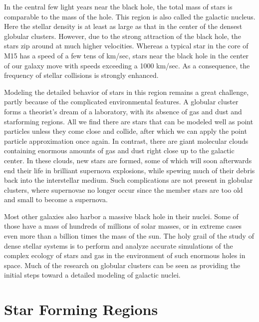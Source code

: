 In the central few light years near the black hole, the total mass of
stars is comparable to the mass of the hole.  This region is also
called the galactic nucleus.  Here the stellar density is at least as
large as that in the center of the densest globular clusters.  However,
due to the strong attraction of the black hole, the stars zip around at
much higher velocities.  Whereas a typical star in the core of M15 has
a speed of a few tens of km/sec, stars near the black hole in the
center of our galaxy move with speeds exceeding a 1000 km/sec.  As a
consequence, the frequency of stellar collisions is strongly enhanced.

Modeling the detailed behavior of stars in this region remains a great
challenge, partly because of the complicated environmental features.
A globular cluster forms a theorist's dream of a laboratory, with its
absence of gas and dust and starforming regions.  All we find there
are stars that can be modeled well as point particles unless they come
close and collide, after which we can apply the point particle
approximation once again.  In contrast, there are giant molecular
clouds containing enormous amounts of gas and dust right close up to
the galactic center.  In these clouds, new stars are formed, some of
which will soon afterwards end their life in brilliant supernova
explosions, while spewing much of their debris back into the
interstellar medium.  Such complications are not present in globular
clusters, where supernovae no longer occur since the member stars are
too old and small to become a supernova.

Most other galaxies also harbor a massive black hole in their nuclei.
Some of those have a mass of hundreds of millions of solar masses, or
in extreme cases even more than a billion times the mass of the sun.
The holy grail of the study of dense stellar systems is to perform and
analyze accurate simulations of the complex ecology of stars and gas
in the environment of such enormous holes in space.  Much of the
research on globular clusters can be seen as providing the initial
steps toward a detailed modeling of galactic nuclei.

\section{Star Forming Regions}

